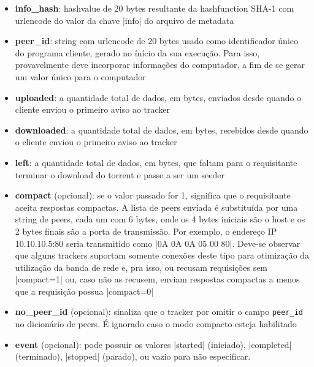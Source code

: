 \begin{itemize}
    \item \textbf{info\_hash}: \gls*{hashvalue} de 20 bytes resultante da
    \gls*{hashfunction} SHA-1 com \gls*{urlencode} do valor da chave \bverb|info| do
    arquivo de \gls*{metadata}

    \item \textbf{peer\_id}: \gls*{string} com \gls*{urlencode} de 20 bytes usado como
    identificador único do programa cliente, gerado no ínício da sua execução. Para
    isso, provavelmente deve incorporar informações do computador, a fim de se gerar um
    valor único para o computador

    \item \textbf{uploaded}: a quantidade total de dados, em bytes, enviados desde
    quando o cliente enviou o primeiro aviso ao \gls*{tracker}

    \item \textbf{downloaded}: a quantidade total de dados, em bytes, recebidos desde
    quando o cliente enviou o primeiro aviso ao \gls*{tracker}

    \item \textbf{left}: a quantidade total de dados, em bytes, que faltam para o
    requisitante terminar o download do \gls*{torrent} e passe a ser um \gls*{seeder}

    \item \textbf{compact} (opcional): se o valor passado for 1, significa que o
    requisitante aceita respostas compactas. A lista de \glspl*{peer} enviada é
    substituída por uma \gls*{string} de peers, cada um com 6 bytes, onde os 4 bytes
    iniciais são o host e os 2 bytes finais são a porta de transmissão. Por exemplo, o
    endereço IP 10.10.10.5:80 seria transmitido como \bverb|0A 0A 0A 05 00 80|. Deve-se
    observar que alguns \glspl*{tracker} suportam somente conexões deste tipo para
    otimização da utilização da banda de rede e, pra isso, ou recusam requisições sem
    \bverb|compact=1| ou, caso não as recusem, enviam respostas compactas a menos que a
    requisição possua \bverb|compact=0|

    \item \textbf{no\_peer\_id} (opcional): sinaliza que o \gls*{tracker} por omitir o
    campo \textcolor{Bittersweet}{\texttt{peer\_id}} no dicionário de \glspl*{peer}. É
    ignorado caso o modo compacto esteja habilitado

    \item \textbf{event} (opcional): pode possuir os valores \sverb|started|
    (iniciado), \sverb|completed| (terminado), \sverb|stopped| (parado), ou vazio para
    não especificar.


\end{itemize}
